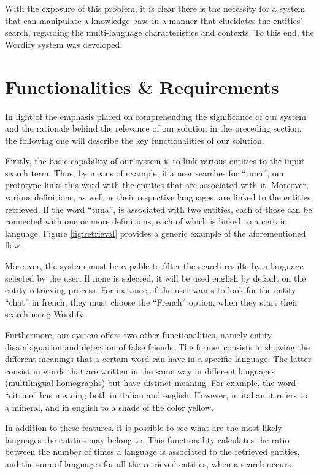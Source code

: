 \documentclass[twocolumn,twoside,11pt,a4paper]{article}
\begin{document}
With the exposure of this problem, it is clear there is the necessity for a system that can manipulate a knowledge base in a manner that elucidates the entities' search, regarding the multi-language characteristics and contexts. To this end, the Wordify system was developed.

\section{Functionalities \& Requirements}\label{sec:requirements}

In light of the emphasis placed on comprehending the significance of our system and the rationale behind the relevance of our solution in the preceding section, the following one will describe the key functionalities of our solution. 

Firstly, the basic capability of our system is to link various entities to the input search term. Thus, by means of example, if a user searches for ``tuna'', our prototype links this word with the entities that are associated with it. Moreover, various definitions, as well as their respective languages, are linked to the entities retrieved. If the word ``tuna'', is associated with two entities, each of those can be connected with one or more definitions, each of which is linked to a certain language. Figure \ref{fig:retrieval} provides a generic example of the aforementioned flow. 

Moreover, the system must be capable to filter the search results by a language selected by the user. If none is selected, it will be used english by default on the entity retrieving process. For instance, if the user wants to look for the entity ``chat'' in french, they must choose the ``French'' option, when they start their search using Wordify.

Furthermore, our system offers two other functionalities, namely entity disambiguation and detection of false friends. The former consists in showing the different meanings that a certain word can have in a specific language. The latter consist in words that are written in the same way in different languages (multilingual homographs) but have distinct meaning. For example, the word ``citrine'' has meaning both in italian and english. However, in italian it refers to a mineral, and in english to a shade of the color yellow.

In addition to these features, it is possible to see what are the most likely languages the entities may belong to. This functionality calculates the ratio between the number of times a language is associated to the retrieved entities, and the sum of languages for all the retrieved entities, when a search occurs.
\end{document}
